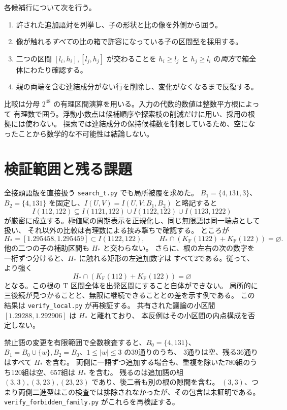 \documentclass[10pt,a4paper]{article}
\newcommand{\KF}{K_{\mathrm F}}
\begin{document}
各候補行について次を行う。
\begin{enumerate}
\item 許された追加語対を列挙し、子の形状と比の像を外側から囲う。
\item 像が触れる\emph{すべて}の比の箱で許容になっている子の区間型を採用する。
\item 二つの区間 $[l_i,h_i],[l_j,h_j]$ が交わることを
 $h_i\ge l_j$ と $h_j\ge l_i$ の\emph{両方}で箱全体にわたり確認する。
\item 親の両端を含む連結成分がない行を削除し、変化がなくなるまで反復する。
\end{enumerate}
比較は分母 $2^{48}$ の有理区間演算を用いる。入力の代数的数値は整数平方根によって
有理数で囲う。浮動小数点は候補順序や探索枝の削減だけに用い、採用の根拠には使わない。
探索では連結成分の保持候補数を制限しているため、空になったことから数学的な不可能性は結論しない。

\section{検証範囲と残る課題}
全接頭語版を直接扱う \texttt{search\_t.py} でも局所被覆を求めた。
$B_1=\{4,131,3\}$、$B_2=\{4,131\}$ を固定し、$I(U,V)=I(U,V;B_1,B_2)$ と略記すると
\[
 I(112,122)\subseteq I(1121,122)\cup I(1122,122)\cup I(1123,1222)
\]
が厳密に成立する。極値尾の周期表示を正規化し、同じ無限語は同一端点として扱い、
それ以外の比較は有理数による挟み撃ちで確認する。
ところが
\[
 H_*=[1.295458,1.295459]\subset I(1122,122),\qquad
 H_*\cap(\KF(1122)+\KF(122))=\varnothing.
\]
他の二つの子の補助区間も $H_*$ と交わらない。
さらに、根の左右の次の数字を一桁ずつ分けると、$H_*$ に触れる矩形の左追加数字は
すべて2である。従って、より強く
\[
 H_*\cap(\KF(112)+\KF(122))=\varnothing
\]
となる。この根の T 区間全体を出発区間にすること自体ができない。
局所的に三後続が見つかることと、無限に継続できることとの差を示す例である。
この結果は \texttt{verify\_local.py} が再検証する。
共有された議論の小区間 $[1.29288,1.292906]$ は $H_*$ と離れており、
本反例はその小区間の内点構成を否定しない。

禁止語の変更を有限範囲で全数検査すると、$B_0=\{4,131\}$、
$B_1=B_0\cup\{w\},B_2=B_0$、$1\le |w|\le3$ の39通りのうち、
3通りは空、残る36通りはすべて $H_*$ を含む。
両側に一語ずつ追加する場合も、重複を除いた780組のうち120組は空、657組は $H_*$ を含む。
残るのは追加語の組 $(3,3),(3,23),(23,23)$ であり、後二者も別の根の隙間を含む。
$(3,3)$、つまり両側二進型はこの検査では排除されなかったが、その包含は未証明である。
\texttt{verify\_forbidden\_family.py} がこれらを再検証する。
\end{document}
